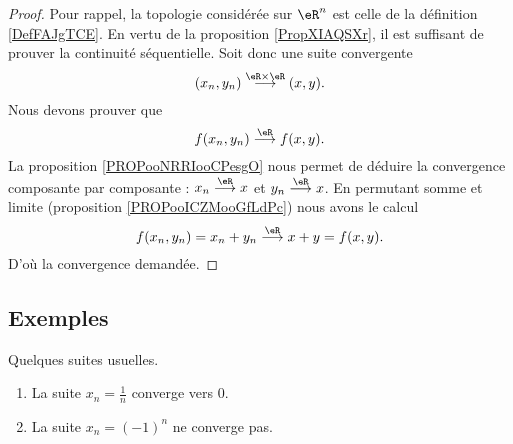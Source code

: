\begin{proof}
	Pour rappel, la topologie considérée sur \( \eR^n\) est celle de la définition \ref{DefFAJgTCE}. En vertu de la proposition \ref{PropXIAQSXr}, il est suffisant de prouver la continuité séquentielle. Soit donc une suite convergente
	\begin{equation}
		(x_n,y_n)\stackrel{\eR\times \eR}{\longrightarrow}(x,y).
	\end{equation}
	Nous devons prouver que
	\begin{equation}
		f(x_n,y_n)\stackrel{\eR}{\longrightarrow}f(x,y).
	\end{equation}
	La proposition \ref{PROPooNRRIooCPesgO} nous permet de déduire la convergence composante par composante : \( x_n\stackrel{\eR}{\longrightarrow}x\) et \( y_n\stackrel{\eR}{\longrightarrow}x\). En permutant somme et limite (proposition \ref{PROPooICZMooGfLdPc}) nous avons le calcul
	\begin{equation}
		f(x_n,y_n)=x_n+y_n\stackrel{\eR}{\longrightarrow}x+y=f(x,y).
	\end{equation}
	D'où la convergence demandée.
\end{proof}

\subsection{Exemples}

\begin{lemma}       \label{LEMooNDSKooMsexOq}
	Quelques suites usuelles.
	\begin{enumerate}
		\item		\label{ITEMooWTAYooRisBLO}
		      La suite \( x_n=\frac{1}{ n }\) converge vers \( 0\).
		\item	\label{ITEMooOYSEooROKIKs}
		      La suite \( x_n=(-1)^n\) ne converge pas.
	\end{enumerate}
\end{lemma}

